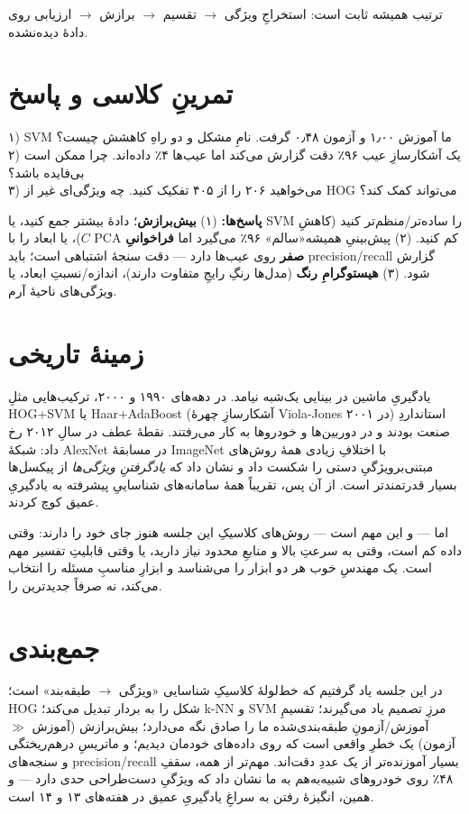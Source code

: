 \documentclass[12pt,a4paper]{article}
\begin{document}
ترتیب همیشه ثابت است: استخراجِ ویژگی $\rightarrow$ تقسیم $\rightarrow$ برازش $\rightarrow$ ارزیابی روی دادهٔ دیده‌نشده.

\section{تمرینِ کلاسی و پاسخ}

\begin{tamrin}
۱) SVMِ ما آموزش ۱٫۰۰ و آزمون ۰٫۴۸ گرفت. نامِ مشکل و دو راهِ کاهشش چیست؟\\
۲) یک آشکارسازِ عیب ۹۶٪ دقت گزارش می‌کند اما عیب‌ها ۴٪ داده‌اند. چرا ممکن است بی‌فایده باشد؟\\
۳) می‌خواهید ۲۰۶ را از ۴۰۵ تفکیک کنید. چه ویژگی‌ای غیر از HOG می‌تواند کمک کند؟
\end{tamrin}

\textbf{پاسخ‌ها:} (۱) \textbf{بیش‌برازش}؛ دادهٔ بیشتر جمع کنید، یا SVM را ساده‌تر/منظم‌تر کنید (کاهشِ $C$)، یا ابعاد را با PCA کم کنید. (۲) پیش‌بینیِ همیشه‌«سالم» ۹۶٪ می‌گیرد اما \textbf{فراخوانیِ صفر} روی عیب‌ها دارد — دقت سنجهٔ اشتباهی است؛ باید precision/recall گزارش شود. (۳) \textbf{هیستوگرامِ رنگ} (مدل‌ها رنگِ رایجِ متفاوت دارند)، اندازه/نسبتِ ابعاد، یا ویژگی‌های ناحیهٔ آرم.

\section{زمینهٔ تاریخی}

یادگیریِ ماشین در بینایی یک‌شبه نیامد. در دهه‌های ۱۹۹۰ و ۲۰۰۰، ترکیب‌هایی مثلِ HOG+SVM یا Haar+AdaBoost (آشکارسازِ چهرهٔ Viola-Jones در ۲۰۰۱) استانداردِ صنعت بودند و در دوربین‌ها و خودروها به کار می‌رفتند. نقطهٔ عطف در سالِ ۲۰۱۲ رخ داد: شبکهٔ AlexNet در مسابقهٔ ImageNet با اختلافِ زیادی همهٔ روش‌های مبتنی‌بر‌ویژگیِ دستی را شکست داد و نشان داد که \emph{یادگرفتنِ ویژگی‌ها} از پیکسل‌ها بسیار قدرتمندتر است. از آن پس، تقریباً همهٔ سامانه‌های شناساییِ پیشرفته به یادگیریِ عمیق کوچ کردند.

\begin{yaddasht}
اما — و این مهم است — روش‌های کلاسیکِ این جلسه هنوز جای خود را دارند: وقتی داده کم است، وقتی به سرعتِ بالا و منابعِ محدود نیاز دارید، یا وقتی قابلیتِ تفسیر مهم است. یک مهندسِ خوب هر دو ابزار را می‌شناسد و ابزارِ مناسبِ مسئله را انتخاب می‌کند، نه صرفاً جدیدترین را.
\end{yaddasht}

\section{جمع‌بندی}

در این جلسه یاد گرفتیم که خط‌لولهٔ کلاسیکِ شناسایی «ویژگی $\rightarrow$ طبقه‌بند» است؛ HOG شکل را به بردار تبدیل می‌کند؛ k-NN و SVM مرزِ تصمیم یاد می‌گیرند؛ تقسیمِ آموزش/آزمونِ طبقه‌بندی‌شده ما را صادق نگه می‌دارد؛ بیش‌برازش (آموزش $\gg$ آزمون) یک خطرِ واقعی است که روی داده‌های خودمان دیدیم؛ و ماتریسِ درهم‌ریختگی و سنجه‌های precision/recall بسیار آموزنده‌تر از یک عددِ دقت‌اند. مهم‌تر از همه، سقفِ ۴۸٪ روی خودروهای شبیه‌به‌هم به ما نشان داد که ویژگیِ دست‌طراحی حدی دارد — و همین، انگیزهٔ رفتن به سراغِ یادگیریِ عمیق در هفته‌های ۱۳ و ۱۴ است.
\end{document}
